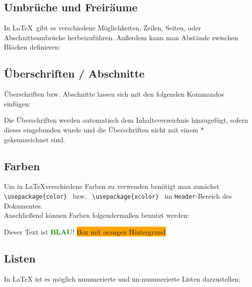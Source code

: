 \subsection{Umbrüche und Freiräume}
In \LaTeX \ gibt es verschiedene Möglichkeiten, Zeilen, Seiten, oder 
Abschnittsumbrüche herbeizuführen. Außerdem kann man Abstände zwischen Blöcken 
definieren:


\subsection{Überschriften / Abschnitte}
Überschriften bzw. Abschnitte lassen sich mit den folgenden Kommandos einfügen:

Die Überschriften werden automatisch dem Inhaltsverzeichnis hinzugefügt, sofern 
dieses eingebunden wurde und die Überschriften nicht mit einem $*$ 
gekennzeichnet sind.
\subsection{Farben}

Um in \LaTeX verschiedene Farben zu verwenden benötigt man zunächst
\lstinline$ \usepackage{color} $ bzw. \lstinline$ \usepackage{xcolor} $ im 
\texttt{Header}-Bereich des Dokumentes.
\\
Anschließend können Farben folgendermaßen benutzt werden:
\begin{flushleft}
\pagecolor{white}   %
\color{blue}         %
Dieser Text ist
\textcolor{green}{\textbf{BLAU}}!    %
\colorbox{orange}{Box mit orangen Hintergrund}   %
\color{schrift}
\\
\end{flushleft}



\subsection{Listen}
In LaTeX ist es möglich nummerierte und un-nummerierte Listen darzustellen: